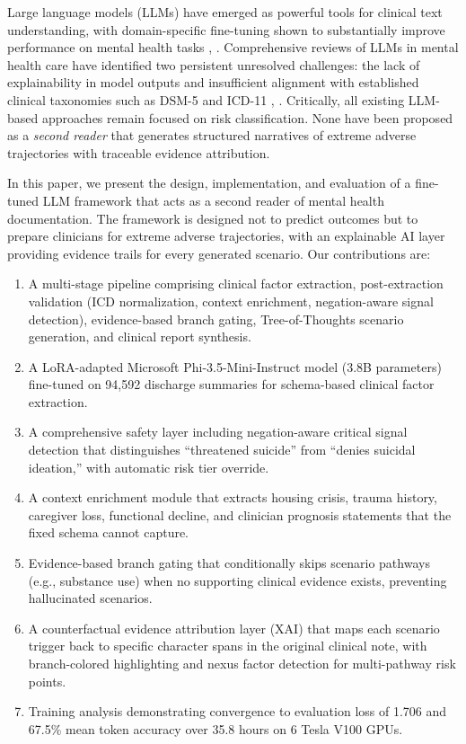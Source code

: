 \documentclass[conference]{IEEEtran}
\begin{document}
Large language models (LLMs) have emerged as powerful tools for clinical text understanding, with domain-specific fine-tuning shown to substantially improve performance on mental health tasks \cite{b4}, \cite{b5}. Comprehensive reviews of LLMs in mental health care have identified two persistent unresolved challenges: the lack of explainability in model outputs and insufficient alignment with established clinical taxonomies such as DSM-5 and ICD-11 \cite{b6}, \cite{b7}. Critically, all existing LLM-based approaches remain focused on risk classification. None have been proposed as a \textit{second reader} that generates structured narratives of extreme adverse trajectories with traceable evidence attribution.

In this paper, we present the design, implementation, and evaluation of a fine-tuned LLM framework that acts as a second reader of mental health documentation. The framework is designed not to predict outcomes but to prepare clinicians for extreme adverse trajectories, with an explainable AI layer providing evidence trails for every generated scenario. Our contributions are:

\begin{enumerate}
\item A multi-stage pipeline comprising clinical factor extraction, post-extraction validation (ICD normalization, context enrichment, negation-aware signal detection), evidence-based branch gating, Tree-of-Thoughts scenario generation, and clinical report synthesis.
\item A LoRA-adapted Microsoft Phi-3.5-Mini-Instruct model (3.8B parameters) fine-tuned on 94,592 discharge summaries for schema-based clinical factor extraction.
\item A comprehensive safety layer including negation-aware critical signal detection that distinguishes ``threatened suicide'' from ``denies suicidal ideation,'' with automatic risk tier override.
\item A context enrichment module that extracts housing crisis, trauma history, caregiver loss, functional decline, and clinician prognosis statements that the fixed schema cannot capture.
\item Evidence-based branch gating that conditionally skips scenario pathways (e.g., substance use) when no supporting clinical evidence exists, preventing hallucinated scenarios.
\item A counterfactual evidence attribution layer (XAI) that maps each scenario trigger back to specific character spans in the original clinical note, with branch-colored highlighting and nexus factor detection for multi-pathway risk points.
\item Training analysis demonstrating convergence to evaluation loss of 1.706 and 67.5\% mean token accuracy over 35.8 hours on 6 Tesla V100 GPUs.
\end{enumerate}
\end{document}
